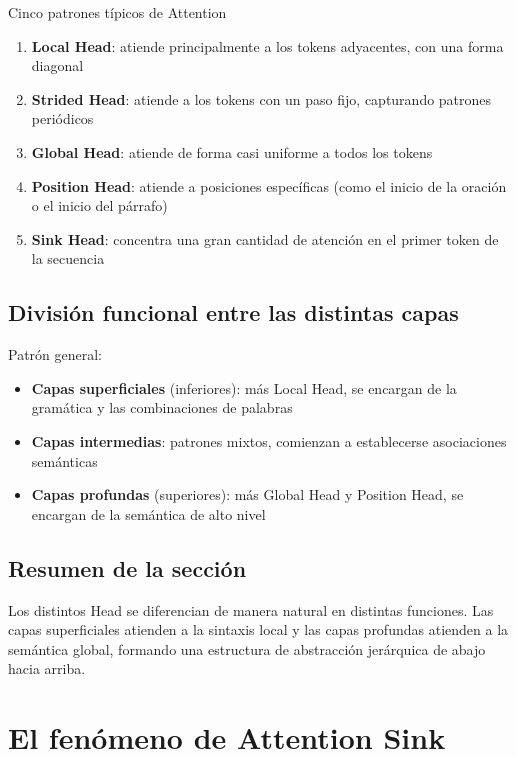 \documentclass[a4paper]{article}
\begin{document}
\begin{importantbox}{Cinco patrones típicos de Attention}
\begin{enumerate}
  \item \textbf{Local Head}: atiende principalmente a los tokens adyacentes, con una forma diagonal
  \item \textbf{Strided Head}: atiende a los tokens con un paso fijo, capturando patrones periódicos
  \item \textbf{Global Head}: atiende de forma casi uniforme a todos los tokens
  \item \textbf{Position Head}: atiende a posiciones específicas (como el inicio de la oración o el inicio del párrafo)
  \item \textbf{Sink Head}: concentra una gran cantidad de atención en el primer token de la secuencia
\end{enumerate}
\end{importantbox}

\subsection{División funcional entre las distintas capas}

Patrón general:
\begin{itemize}
  \item \textbf{Capas superficiales} (inferiores): más Local Head, se encargan de la gramática y las combinaciones de palabras
  \item \textbf{Capas intermedias}: patrones mixtos, comienzan a establecerse asociaciones semánticas
  \item \textbf{Capas profundas} (superiores): más Global Head y Position Head, se encargan de la semántica de alto nivel
\end{itemize}

\subsection{Resumen de la sección}

Los distintos Head se diferencian de manera natural en distintas funciones. Las capas superficiales atienden a la sintaxis local y las capas profundas atienden a la semántica global, formando una estructura de abstracción jerárquica de abajo hacia arriba.

\section{El fenómeno de Attention Sink}
\end{document}
